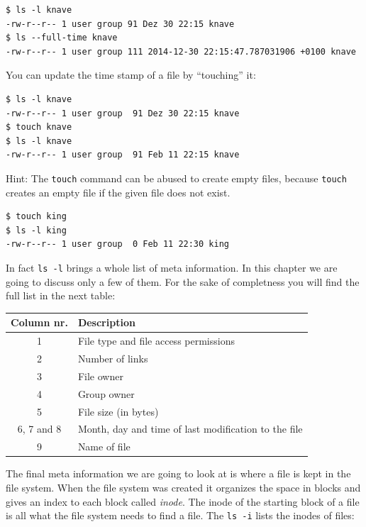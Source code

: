 \documentclass[11pt,a4paper,twoside]{article}
\begin{document}
\begin{lstlisting}[frame=single]
$ ls -l knave
-rw-r--r-- 1 user group 91 Dez 30 22:15 knave
$ ls --full-time knave
-rw-r--r-- 1 user group 111 2014-12-30 22:15:47.787031906 +0100 knave
\end{lstlisting}

You can update the time stamp of a file by ``touching'' it:

\begin{lstlisting}[frame=single]
$ ls -l knave
-rw-r--r-- 1 user group  91 Dez 30 22:15 knave
$ touch knave
$ ls -l knave
-rw-r--r-- 1 user group  91 Feb 11 22:15 knave
\end{lstlisting}

Hint: The \texttt{touch} command can be abused to create empty files, because
\texttt{touch} creates an empty file if the given file does not exist. 

\begin{lstlisting}[frame=single]
$ touch king
$ ls -l king
-rw-r--r-- 1 user group  0 Feb 11 22:30 king
\end{lstlisting}


In fact \texttt{ls -l} brings a whole list of meta information. In this 
chapter we are going to discuss only a few of them. For the sake of 
completness you will find the full list in the next table: 

\begin{center}
\begin{tabular}{ c | l }
\hline
Column nr. & Description \\
\hline
1 & File type and file access permissions \\
2 & Number of links \\
3 & File owner \\
4 & Group owner \\
5 & File size (in bytes) \\
6, 7 and 8 & Month, day and time of last modification to the file \\
9 & Name of file \\
\hline
\end{tabular}
\end{center}

The final meta information we are going to look at is where a file is
kept in the file system. When the file system was created it organizes
the space in blocks and gives an index to each block called \emph{inode}.
The inode of the starting block of a file is all what the file system 
needs to find a file. The \texttt{ls -i} lists the inodes of files:
\end{document}

